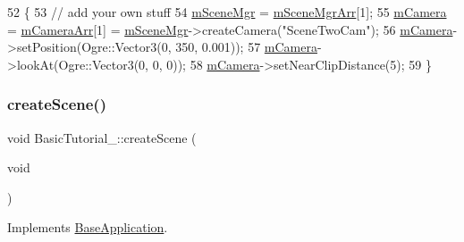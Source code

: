 \begin{DoxyCode}
52 \{
53     \textcolor{comment}{// add your own stuff}
54     \hyperlink{class_base_application_a8a7684f4f9a57ed3089048ad1a913b2d}{mSceneMgr} = \hyperlink{class_basic_tutorial__00_a603779b6087698c57b7989e16d8a9b93}{mSceneMgrArr}[1];
55     \hyperlink{class_base_application_a3829c6b12afe911e97e6b4524b33a38b}{mCamera} = \hyperlink{class_basic_tutorial__00_af8d457d912286a98c0975c52d4faf910}{mCameraArr}[1] = \hyperlink{class_base_application_a8a7684f4f9a57ed3089048ad1a913b2d}{mSceneMgr}->createCamera(\textcolor{stringliteral}{"SceneTwoCam"});
56     \hyperlink{class_base_application_a3829c6b12afe911e97e6b4524b33a38b}{mCamera}->setPosition(Ogre::Vector3(0, 350, 0.001));
57     \hyperlink{class_base_application_a3829c6b12afe911e97e6b4524b33a38b}{mCamera}->lookAt(Ogre::Vector3(0, 0, 0));
58     \hyperlink{class_base_application_a3829c6b12afe911e97e6b4524b33a38b}{mCamera}->setNearClipDistance(5);
59 \}
\end{DoxyCode}
\mbox{\label{class_basic_tutorial__00_a15a3d4673724ec99077ce992f996a550}} 
\subsubsection{\texorpdfstring{create\+Scene()}{createScene()}}
{\footnotesize\ttfamily void Basic\+Tutorial\+\_\+::create\+Scene (\begin{DoxyParamCaption}\item[{void}]{ }\end{DoxyParamCaption})\hspace{0.3cm}{\ttfamily [virtual]}}



Implements \hyperlink{class_base_application_aa97beeb4059b17d0ec22eae33286ec2d}{Base\+Application}.


